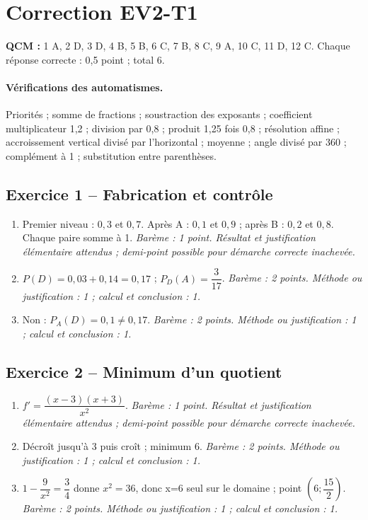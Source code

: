 \clearpage\section*{Correction EV2-T1}\label{EV2-T1-CORR}
\textbf{QCM :} 1 A, 2 D, 3 D, 4 B, 5 B, 6 C, 7 B, 8 C, 9 A, 10 C, 11 D, 12 C. Chaque réponse correcte : 0,5 point ; total 6.
\paragraph{Vérifications des automatismes.} Priorités ; somme de fractions ; soustraction des exposants ; coefficient multiplicateur 1,2 ; division par 0,8 ; produit 1,25 fois 0,8 ; résolution affine ; accroissement vertical divisé par l’horizontal ; moyenne ; angle divisé par 360 ; complément à 1 ; substitution entre parenthèses.
\subsection*{Exercice 1 -- Fabrication et contrôle}
\begin{enumerate}
\item Premier niveau : $0{,}3$ et $0{,}7$. Après A : $0{,}1$ et $0{,}9$ ; après B : $0{,}2$ et $0{,}8$. Chaque paire somme à 1. \textit{Barème : 1 point. Résultat et justification élémentaire attendus ; demi-point possible pour démarche correcte inachevée.}
\item $P(D)=0{,}03+0{,}14=0{,}17$ ; $P_D(A)=\dfrac{3}{17}$. \textit{Barème : 2 points. Méthode ou justification : 1 ; calcul et conclusion : 1.}
\item Non : $P_A(D)=0{,}1\ne0{,}17$. \textit{Barème : 2 points. Méthode ou justification : 1 ; calcul et conclusion : 1.}
\end{enumerate}
\subsection*{Exercice 2 -- Minimum d’un quotient}
\begin{enumerate}
\item $f\prime =\dfrac{(x-3)(x+3)}{x^2}$. \textit{Barème : 1 point. Résultat et justification élémentaire attendus ; demi-point possible pour démarche correcte inachevée.}
\item Décroît jusqu’à 3 puis croît ; minimum 6. \textit{Barème : 2 points. Méthode ou justification : 1 ; calcul et conclusion : 1.}
\item $1-\dfrac{9}{x^2}=\dfrac{3}{4}$ donne $x^2=36$, donc x=6 seul sur le domaine ; point $(6;\dfrac{15}{2})$. \textit{Barème : 2 points. Méthode ou justification : 1 ; calcul et conclusion : 1.}
\end{enumerate}
